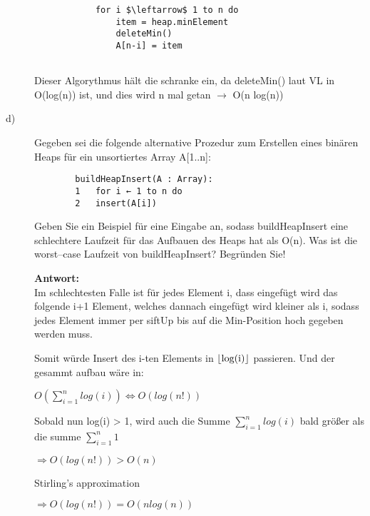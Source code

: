 \documentclass[12pt, a4paper, oneside]{article}
\begin{document}
\begin{description}
\begin{verbatim}
			for i $\leftarrow$ 1 to n do
				item = heap.minElement
				deleteMin()
				A[n-i] = item
			
	\end{verbatim}

	Dieser Algorythmus hält die schranke ein, da deleteMin() laut VL in O(log(n)) ist, und dies wird n mal getan $\rightarrow$ O(n log(n))
	
	\item[d)] Gegeben sei die folgende alternative Prozedur zum Erstellen eines binären Heaps für
	ein unsortiertes Array A[1..n]:
	\begin{verbatim}
		buildHeapInsert(A : Array):
		1 	for i ← 1 to n do
		2 	insert(A[i])
	\end{verbatim}
	Geben Sie ein Beispiel für eine Eingabe an, sodass buildHeapInsert eine schlechtere
	Laufzeit für das Aufbauen des Heaps hat als O(n). Was ist die worst–case Laufzeit von
	buildHeapInsert? Begründen Sie!
	
	\textbf{Antwort:}\\
	Im schlechtesten Falle ist für jedes Element i, dass eingefügt wird das folgende i+1 Element, welches dannach eingefügt wird kleiner als i, sodass jedes Element immer per siftUp bis auf die Min-Position hoch gegeben werden muss.
	
	Somit würde Insert des i-ten Elements in \(\lfloor$log(i)$\rfloor\) passieren.
	Und der gesammt aufbau wäre in:
	
	\centerline{\(O(\sum^{n}_{i=1}log(i)) \Longleftrightarrow O(log(n!))\)}
	\centerline{   }
	
	Sobald nun log(i) > 1, wird auch die Summe \(\sum^{n}_{i=1}log(i)\) bald größer als die summe \(\sum^{n}_{i=1}1\) 
	
	\centerline{\(\Longrightarrow O(log(n!)) > O(n)\)}
	\centerline{Stirling's approximation}
	\centerline{\(\Longrightarrow O(log(n!)) = O(n log(n))\)}
	
	
\end{description}
	
\end{document}
